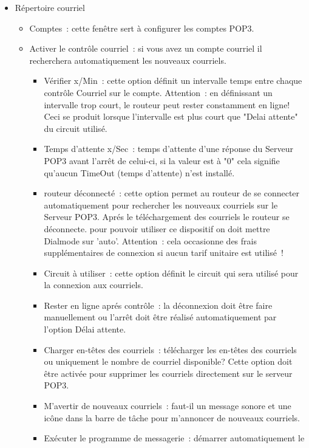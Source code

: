 \begin{itemize}
  \item Répertoire courriel
    \begin{itemize}
      \item Comptes~: cette fenêtre sert à configurer les comptes POP3.
      \item Activer le contrôle courriel~: si vous avez un compte courriel il
        recherchera automatiquement les nouveaux courriels.
        \begin{itemize}
          \item Vérifier x/Min~: cette option définit un intervalle temps entre
            chaque contrôle Courriel sur le compte. Attention~: en définissant un 
            intervalle trop court, le routeur peut rester constamment en ligne!
            Ceci se produit lorsque l'intervalle est plus court que "Delai attente"
            du circuit utilisé.
          \item Temps d'attente x/Sec~: temps d'attente d'une réponse du Serveur POP3
            avant l'arrêt de celui-ci, si la valeur est à "0" cela signifie qu'aucun
            TimeOut (temps d'attente) n'est installé.
          \item routeur déconnecté~: cette option permet au routeur de se connecter
            automatiquement pour rechercher les nouveaux courriels sur le Serveur POP3.
            Aprés le téléchargement des courriels le routeur se déconnecte. pour pouvoir
            utiliser ce dispositif on doit mettre Dialmode sur 'auto'. Attention~:
            cela occasionne des frais supplémentaires de connexion si aucun tarif
            unitaire est utilisé~!
          \item Circuit à utiliser~: cette option définit le circuit qui sera utilisé
            pour la connexion aux courriels.
          \item Rester en ligne aprés contrôle~: la déconnexion doit être faire
            manuellement ou l'arrêt doit être réalisé automatiquement par l'option
            Délai attente.
          \item Charger en-têtes des courriels~: télécharger les en-têtes des courriels ou
            uniquement le nombre de courriel disponible? Cette option doit être activée
            pour supprimer les courriels directement sur le serveur POP3.
         \item M'avertir de nouveaux courriels~: faut-il un message sonore et une icône
            dans la barre de tâche pour m'annoncer de nouveaux courriels.
         \item Exécuter le programme de messagerie~: démarrer automatiquement le

\end{itemize}
\end{itemize}
\end{itemize}
